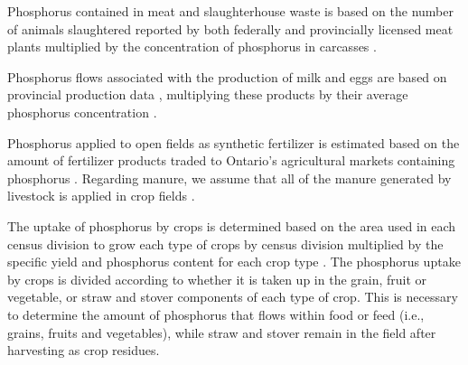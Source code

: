 \documentclass[authoryear]{elsarticle}
\begin{document}
Phosphorus contained in meat and slaughterhouse waste is based on the number of animals slaughtered reported by both federally and provincially licensed meat plants \citep{SlaughterFederalRedMeat, SlaughterFederalPoultry} multiplied by the concentration of phosphorus in carcasses \citep{LivetoCarcassWeight,hayse1973eviscerated,brake1995relationship,NetherlandsCompositions}.

Phosphorus flows associated with the production of milk and eggs are based on provincial production data \citep{EggOntario,MilkOntario}, multiplying these products by their average phosphorus concentration \citep{NutrientValueHealthCanada,chambers2017chicken}.

Phosphorus applied to open fields as synthetic fertilizer is estimated based on the amount of fertilizer products traded to Ontario’s agricultural markets containing phosphorus \citep{FertilizerShipments}. 
Regarding manure, we assume that all of the manure generated by livestock is applied in crop fields \citep{IROWC_PHandbook}.

The uptake of phosphorus by crops is determined based on the area used in each census division \citep{CensusDivisionOpendatasoft} to grow each type of crops by census division \citep{FieldCropsCensus,FieldVegetablesCensus,GreenhousesCensus} multiplied by the specific yield and phosphorus content for each crop type \citep{USDAHandbook}.  The phosphorus uptake by crops is divided according to whether it is taken up in the grain, fruit or vegetable, or straw and stover components of each type of crop. This is necessary to determine the amount of phosphorus that flows within food or feed (i.e., grains, fruits and vegetables), while straw and stover remain in the field after harvesting as crop residues.
\end{document}
